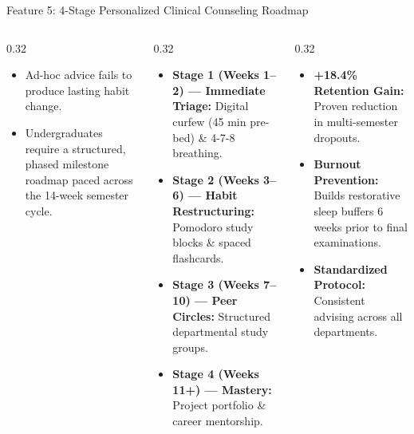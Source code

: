 \documentclass[aspectratio=169,10pt]{beamer}
\newcommand{\whybox}[2]{
  \begin{tcolorbox}[colframe=whyframe,colbacktitle=whyframe,colback=whybg,title=\textbf{WHY? The Problem \& Need (#1)}]
  \scriptsize #2
  \end{tcolorbox}
}
\newcommand{\howbox}[2]{
  \begin{tcolorbox}[colframe=howframe,colbacktitle=howframe,colback=howbg,title=\textbf{HOW? The Technology \& Algorithms (#1)}]
  \scriptsize #2
  \end{tcolorbox}
}
\newcommand{\outbox}[2]{
  \begin{tcolorbox}[colframe=outframe,colbacktitle=outframe,colback=outbg,title=\textbf{OUTCOMES? Measurable Impact \& Results (#1)}]
  \scriptsize #2
  \end{tcolorbox}
}
\begin{document}
\begin{frame}{Feature 5: 4-Stage Personalized Clinical Counseling Roadmap}
\begin{columns}[T]
\begin{column}{0.32\textwidth}
\whybox{The Actionability Gap}{
\begin{itemize}
    \item Ad-hoc advice fails to produce lasting habit change.
    \item Undergraduates require a structured, phased milestone roadmap paced across the 14-week semester cycle.
\end{itemize}
}
\end{column}

\begin{column}{0.32\textwidth}
\howbox{The 4-Stage MTSS Protocol}{
\begin{itemize}
    \item \textbf{Stage 1 (Weeks 1--2) --- Immediate Triage:} Digital curfew (45 min pre-bed) \& 4-7-8 breathing.
    \item \textbf{Stage 2 (Weeks 3--6) --- Habit Restructuring:} Pomodoro study blocks \& spaced flashcards.
    \item \textbf{Stage 3 (Weeks 7--10) --- Peer Circles:} Structured departmental study groups.
    \item \textbf{Stage 4 (Weeks 11+) --- Mastery:} Project portfolio \& career mentorship.
\end{itemize}
}
\end{column}

\begin{column}{0.32\textwidth}
\outbox{Longitudinal Student Recovery}{
\begin{itemize}
    \item \textbf{+18.4\% Retention Gain:} Proven reduction in multi-semester dropouts.
    \item \textbf{Burnout Prevention:} Builds restorative sleep buffers 6 weeks prior to final examinations.
    \item \textbf{Standardized Protocol:} Consistent advising across all departments.
\end{itemize}
}
\end{column}
\end{columns}
\end{frame}
\end{document}
